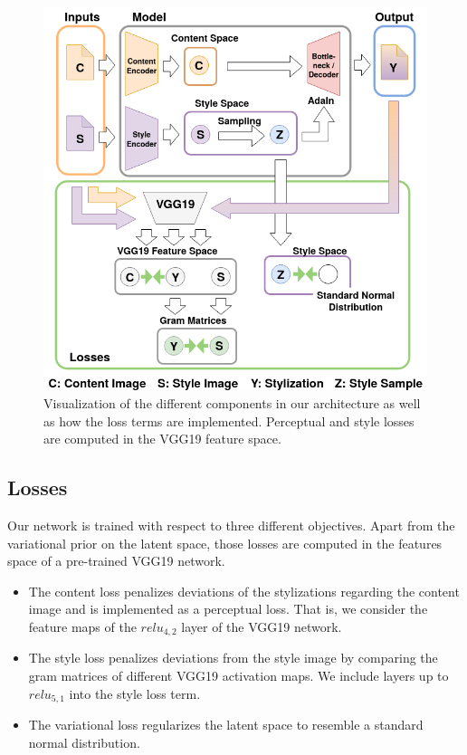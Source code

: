 \documentclass[10pt,twocolumn,letterpaper]{article}
\begin{document}
\begin{figure}
\centering
\includegraphics[width=0.9\linewidth]{pipeline_reduced_semi_verbose.png}
\caption{Visualization of the different components in our architecture as well as how the loss terms are implemented. Perceptual and style losses are computed in the VGG19 feature space.}
\label{fig:model}
\end{figure}
	
	
\subsection{Losses}

Our network is trained with respect to three different objectives. Apart from the variational prior on the latent space, those losses are computed in the features space of a pre-trained VGG19 network.
\begin{itemize}
	\item The content loss penalizes deviations of the stylizations regarding the content image and is implemented as a perceptual loss. That is, we consider the feature maps of the $relu_{4,2}$ layer of the VGG19 network.
	\item The style loss penalizes deviations from the style image by comparing the gram matrices of different VGG19 activation maps. We include layers up to $relu_{5,1}$ into the style loss term.
	\item The variational loss regularizes the latent space to resemble a standard normal distribution.
\end{itemize}
\end{document}
